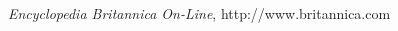 \begin{thebibliography}{99}

{\it Encyclopedia Britannica On-Line}, http://www.britannica.com



\end{thebibliography}
